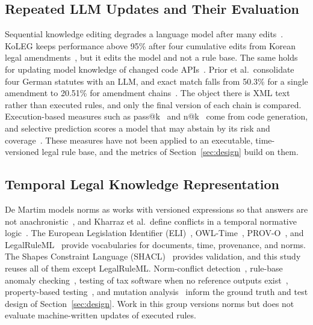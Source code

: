 \subsection{Repeated LLM Updates and Their Evaluation}
Sequential knowledge editing degrades a language model after many edits~\cite{gupta2024editing,gu2024harms}. KoLEG keeps performance above 95\% after four cumulative edits from Korean legal amendments~\cite{seo2025koleg}, but it edits the model and not a rule base. The same holds for updating model knowledge of changed code APIs~\cite{wu2026recode}. Prior et al.\ consolidate four German statutes with an LLM, and exact match falls from 50.3\% for a single amendment to 20.51\% for amendment chains~\cite{prior2025risks}. The object there is XML text rather than executed rules, and only the final version of each chain is compared. Execution-based measures such as pass@k~\cite{chen2021evaluating} and n@k~\cite{li2022alphacode} come from code generation, and selective prediction scores a model that may abstain by its risk and coverage~\cite{xin2021abstention}. These measures have not been applied to an executable, time-versioned legal rule base, and the metrics of Section~\ref{sec:design} build on them.

\subsection{Temporal Legal Knowledge Representation}
De Martim models norms as works with versioned expressions so that answers are not anachronistic~\cite{demartim2025satgraph}, and Kharraz et al.\ define conflicts in a temporal normative logic~\cite{kharraz2024conflicts}. The European Legislation Identifier (ELI)~\cite{publicationsoffice2026elien}, OWL-Time~\cite{cox2017owltime}, PROV-O~\cite{lebo2013provo}, and LegalRuleML~\cite{palmirani2021legalruleml} provide vocabularies for documents, time, provenance, and norms. The Shapes Constraint Language (SHACL)~\cite{knublauch2017shacl} provides validation, and this study reuses all of them except LegalRuleML. Norm-conflict detection~\cite{robaldo2024compliance,khoja2026consistency}, rule-base anomaly checking~\cite{boujelben2025anomalies}, testing of tax software when no reference outputs exist~\cite{tizpaz2023metamorphic,li2025mrgeneration}, property-based testing~\cite{goldstein2024pbt,ravi2025pbtpython}, and mutation analysis~\cite{petrovic2022mutation,petrovic2021mutation} inform the ground truth and test design of Section~\ref{sec:design}. Work in this group versions norms but does not evaluate machine-written updates of executed rules.


